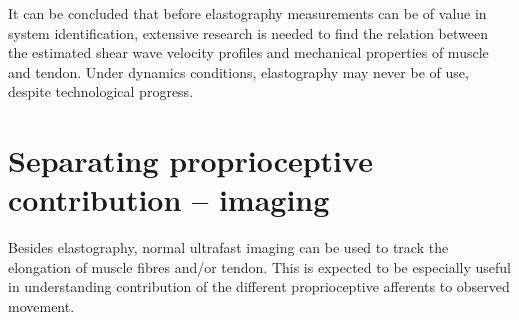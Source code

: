 It can be concluded that before elastography measurements can be of value in system identification, extensive research is needed to find the relation between the estimated shear wave velocity profiles and mechanical properties of muscle and tendon. Under dynamics conditions, elastography may never be of use, despite technological progress. \tred


%
%
%
%
%







\newpage











\section{Separating proprioceptive contribution -- imaging}
Besides elastography, normal ultrafast imaging can be used to track the elongation of muscle fibres and/or tendon. This is expected to be especially useful in understanding contribution of the different proprioceptive afferents to observed movement. 

